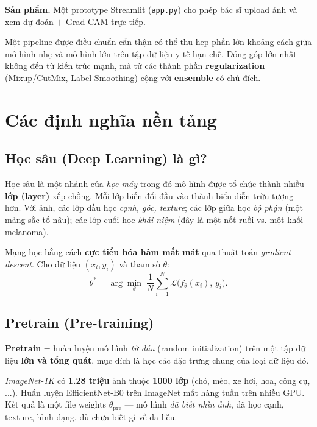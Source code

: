 \documentclass[11pt,a4paper]{article}
\begin{document}
\textbf{Sản phẩm.} Một prototype Streamlit (\texttt{app.py}) cho phép bác sĩ upload ảnh và xem dự đoán $+$ Grad-CAM trực tiếp.

\vspace{6pt}
\begin{idea}
Một pipeline được điều chuẩn cẩn thận có thể thu hẹp phần lớn khoảng cách giữa mô hình nhẹ và mô hình lớn trên tập dữ liệu y tế hạn chế. Đóng góp lớn nhất không đến từ kiến trúc mạnh, mà từ các thành phần \textbf{regularization} (Mixup/CutMix, Label Smoothing) cộng với \textbf{ensemble} có chủ đích.
\end{idea}

\section{Các định nghĩa nền tảng}

\subsection{Học sâu (Deep Learning) là gì?}

Học sâu là một nhánh của \textit{học máy} trong đó mô hình được tổ chức thành nhiều \textbf{lớp (layer)} xếp chồng. Mỗi lớp biến đổi đầu vào thành biểu diễn trừu tượng hơn. Với ảnh, các lớp đầu học \textit{cạnh, góc, texture}; các lớp giữa học \textit{bộ phận} (một mảng sắc tố nâu); các lớp cuối học \textit{khái niệm} (đây là một nốt ruồi vs. một khối melanoma).

Mạng học bằng cách \textbf{cực tiểu hóa hàm mất mát} qua thuật toán \textit{gradient descent}. Cho dữ liệu $(x_i, y_i)$ và tham số $\theta$:
\[
  \theta^* = \arg\min_\theta \; \frac{1}{N}\sum_{i=1}^N \mathcal{L}\bigl(f_\theta(x_i),\, y_i\bigr).
\]

\subsection{Pretrain (Pre-training)}

\textbf{Pretrain} = huấn luyện mô hình \textit{từ đầu} (random initialization) trên một tập dữ liệu \textbf{lớn và tổng quát}, mục đích là học các đặc trưng chung của loại dữ liệu đó.

\begin{example}
\textit{ImageNet-1K} có \textbf{1.28 triệu} ảnh thuộc \textbf{1000 lớp} (chó, mèo, xe hơi, hoa, công cụ, ...). Huấn luyện EfficientNet-B0 trên ImageNet mất hàng tuần trên nhiều GPU. Kết quả là một file weights $\theta_{\text{pre}}$ --- mô hình \textit{đã biết nhìn ảnh}, đã học cạnh, texture, hình dạng, dù chưa biết gì về da liễu.
\end{example}
\end{document}
